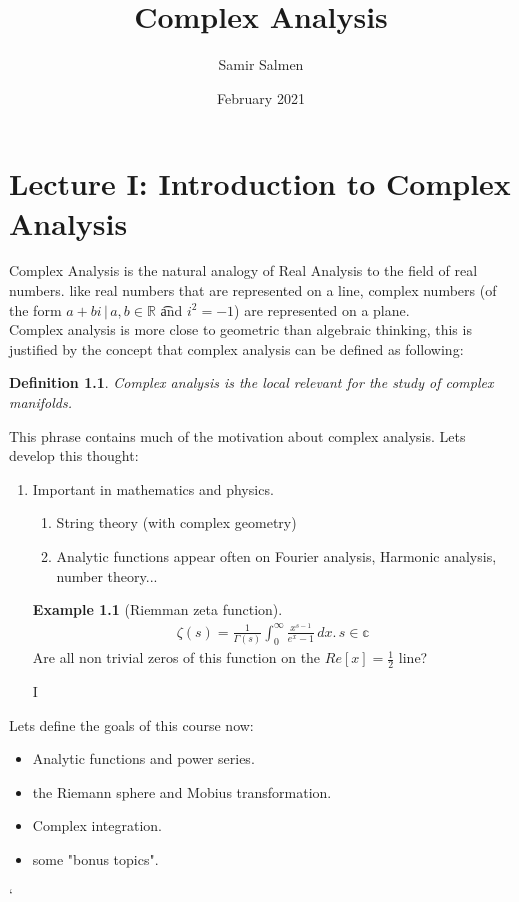 \documentclass[english, a4paper,12pt]{Iart}
\theoremstyle{plain} %
\newtheorem{definition}{Definition}
\theoremstyle{remark}
\theoremstyle{definition}
\newtheorem{example}{Example}[section]
\begin{document}
\author{Samir Salmen}
\title{Complex Analysis}
\date{February 2021}
\newcommand{\C}{\mathbb{C}}
\newcommand{\R}{\mathbb{R}}




\maketitle


\chapter{Lecture I: Introduction to Complex Analysis}


Complex Analysis is the natural analogy of Real Analysis to the field of real numbers.
like real numbers that are represented on a line, complex numbers (of the form $a+bi\,|\,a,b \in \mathbb{R}$ \t and  $i^2 = -1$) are represented on a plane.\\
Complex analysis is more close to geometric than algebraic thinking, this is justified by the concept that complex analysis can be defined as following:
\begin{definition}
    Complex analysis is the local relevant for the study of complex manifolds.
\end{definition}
This phrase contains much of the motivation about complex analysis. Lets develop this thought:
\begin{enumerate}
    \item Important in mathematics and physics.
        \begin{enumerate}
            \item String theory (with complex geometry)
            \item Analytic functions appear often on Fourier analysis, Harmonic analysis, number theory...  
        \end{enumerate}
        \begin{example}[Riemman zeta function]
            \begin{align*}
                \zeta(s) = \frac{1}{\Gamma(s)} \int^\infty_0 \frac{x^{s-1}}{e^x-1} \, dx. \, s\in \mathbb{c}
            \end{align*}
            Are all non trivial zeros of this function on the $Re[x] = \frac{1}{2}$ line?
        \end{example}
I\end{enumerate}
Lets define the goals of this course now:
\begin{itemize}
    \item Analytic functions and power series.
    \item the Riemann sphere and Mobius transformation.
    \item Complex integration.
    \item some "bonus topics".
\end{itemize}`
\end{document}
